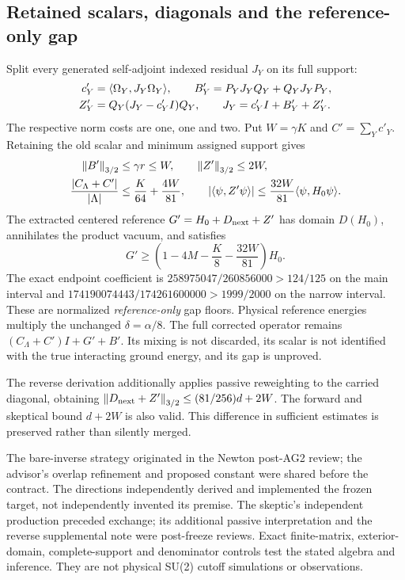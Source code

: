 \subsection{Retained scalars, diagonals and the reference-only gap}
Split every generated self-adjoint indexed residual $J_Y$ on its full support:
\begin{align}
 c'_Y&=\langle\Omega_Y,J_Y\Omega_Y\rangle,\qquad
 B'_Y=P_YJ_YQ_Y+Q_YJ_YP_Y,\notag\\
 Z'_Y&=Q_Y(J_Y-c'_YI)Q_Y,
 \qquad J_Y=c'_YI+B'_Y+Z'_Y.
\end{align}
The respective norm costs are one, one and two. Put $W=\gamma K$ and $C'=\sum_Yc'_Y$. Retaining the old scalar and minimum assigned support gives
\begin{align}
 \left\lVert B'\right\rVert_{3/2}&\le\gamma r\le W,\qquad
 \left\lVert Z'\right\rVert_{3/2}\le2W,\notag\\
 \frac{|C_\Lambda+C'|}{|\Lambda|}&\le\frac K{64}+\frac{4W}{81},\qquad
 |\langle\psi,Z'\psi\rangle|\le\frac{32W}{81}\langle\psi,H_0\psi\rangle.
 \label{eq:ag3-scalar-diagonal}
\end{align}
The extracted centered reference $G'=H_0+D_{\rm next}+Z'$ has domain $D(H_0)$, annihilates the product vacuum, and satisfies
\begin{equation}
 G'\ge\left(1-4M-\frac K8-\frac{32W}{81}\right)H_0.
 \label{eq:ag3-reference}
\end{equation}
The exact endpoint coefficient is $258975047/260856000>124/125$ on the main interval and $174190074443/174261600000>1999/2000$ on the narrow interval. These are normalized \emph{reference-only} gap floors. Physical reference energies multiply the unchanged $\delta=\alpha/8$. The full corrected operator remains $(C_\Lambda+C')I+G'+B'$. Its mixing is not discarded, its scalar is not identified with the true interacting ground energy, and its gap is unproved.

The reverse derivation additionally applies passive reweighting to the carried diagonal, obtaining $\left\lVert D_{\rm next}+Z'\right\rVert_{3/2}\le(81/256)d+2W$. The forward and skeptical bound $d+2W$ is also valid. This difference in sufficient estimates is preserved rather than silently merged.

The bare-inverse strategy originated in the Newton post-AG2 review; the advisor's overlap refinement and proposed constant were shared before the contract. The directions independently derived and implemented the frozen target, not independently invented its premise. The skeptic's independent production preceded exchange; its additional passive interpretation and the reverse supplemental note were post-freeze reviews. Exact finite-matrix, exterior-domain, complete-support and denominator controls test the stated algebra and inference. They are not physical SU(2) cutoff simulations or observations.

